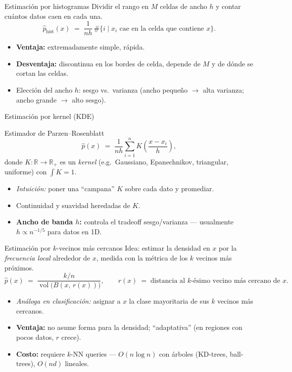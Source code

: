 \documentclass[10pt,aspectratio=169]{beamer}
\newcommand{\R}{\mathbb{R}}
\newcommand{\0}{\mathbf{0}}
\newcommand{\1}{\mathbf{1}}
\begin{document}
\begin{frame}{Estimación por histogramas}
  Dividir el rango en $M$ celdas de ancho $h$ y contar cuántos datos caen en cada una.
  \[
    \hat p_{\text{hist}}(x) \;=\; \frac{1}{n h}\,\#\{i\mid x_i \text{ cae en la celda que contiene } x\}.
  \]
  \begin{itemize}
    \item \textbf{Ventaja:} extremadamente simple, rápida.
    \item \textbf{Desventaja:} discontinua en los bordes de celda,
          depende de $M$ y de dónde se cortan las celdas.
    \item Elección del ancho $h$: sesgo vs.\ varianza (ancho pequeño
          $\to$ alta varianza; ancho grande $\to$ alto sesgo).
  \end{itemize}
\end{frame}

\begin{frame}{Estimación por kernel (KDE)}
  \begin{block}{Estimador de Parzen--Rosenblatt}
    \[
      \hat p(x) \;=\; \frac{1}{n h}\sum_{i=1}^n K\!\left(\frac{x - x_i}{h}\right),
    \]
    donde $K:\R\to\R_+$ es un \emph{kernel} (e.g.\ Gaussiano, Epanechnikov,
    triangular, uniforme) con $\int K = 1$.
  \end{block}
  \begin{itemize}
    \item \emph{Intuición:} poner una ``campana'' $K$ sobre cada dato
          y promediar.
    \item Continuidad y suavidad heredadas de $K$.
    \item \textbf{Ancho de banda $h$:} controla el tradeoff sesgo/varianza
          --- usualmente $h\propto n^{-1/5}$ para datos en 1D.
  \end{itemize}
\end{frame}

\begin{frame}{Estimación por $k$-vecinos más cercanos}
  Idea: estimar la densidad en $x$ por la \emph{frecuencia local}
  alrededor de $x$, medida con la métrica de los $k$ vecinos más próximos.
  \[
    \hat p(x) \;=\; \frac{k/n}{\operatorname{vol}\bigl(B(x,\,r(x))\bigr)},
    \qquad
    r(x) \;=\; \text{distancia al }k\text{-ésimo vecino más cercano de } x.
  \]
  \begin{itemize}
    \item \emph{Análoga en clasificación:} asignar a $x$ la clase
          mayoritaria de sus $k$ vecinos más cercanos.
    \item \textbf{Ventaja:} no asume forma para la densidad; ``adaptativa''
          (en regiones con pocos datos, $r$ crece).
    \item \textbf{Costo:} requiere $k$-NN queries --- $O(n\log n)$ con
          árboles (KD-trees, ball-trees), $O(nd)$ lineales.
  \end{itemize}
\end{frame}
\end{document}
